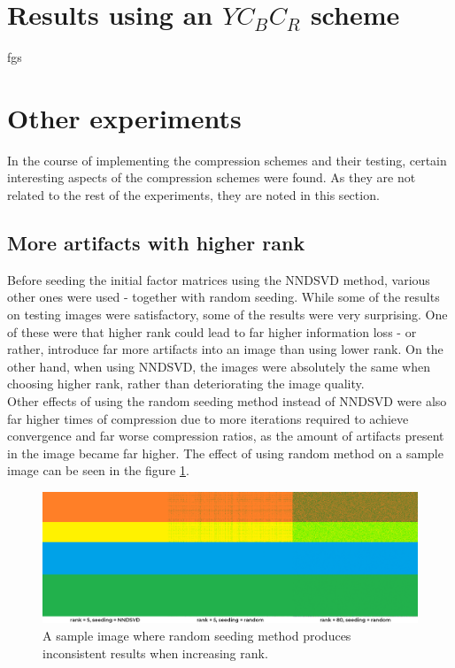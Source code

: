 \documentclass[thesis=M,english]{FITthesis}[2012/10/20]
\begin{document}
\section{Results using an $YC_BC_R$ scheme}
fgs

\section{Other experiments}
In the course of implementing the compression schemes and their testing, certain
interesting aspects of the compression schemes were found. As they are not
related to the rest of the experiments, they are noted in this section.


\subsection{More artifacts with higher rank}
Before seeding the initial factor matrices using the NNDSVD method, various other
ones were used - together with random seeding. While some of the results on testing
images were satisfactory, some of the results were very surprising. One of these were
that higher rank could lead to far higher information loss - or rather, introduce far more
artifacts into an image than using lower rank. On the other hand, when using NNDSVD,
the images were absolutely the same when choosing higher rank, rather than deteriorating
the image quality.
\\

Other effects of using the random seeding method instead of NNDSVD were also far higher
times of compression due to more iterations required to achieve convergence and far worse
compression ratios, as the amount of artifacts present in the image became far higher. The
effect of using random method on a sample image can be seen in the figure \ref{fig:random-seed}.

\begin{figure}[h]
  \centering
  \includegraphics[scale=0.5]{imgs/random-seed-artifacts}
  \caption{A sample image where random seeding method produces inconsistent results
           when increasing rank.}
  \label{fig:random-seed}
\end{figure}
\end{document}
